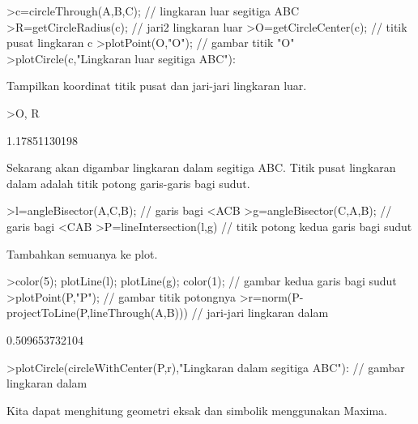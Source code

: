 \documentclass[a4paper,10pt]{article}
\begin{document}
\begin{eulernotebook}
\begin{eulercomment}
\begin{eulercomment}
\begin{eulercomment}
\begin{eulercomment}
\begin{eulercomment}
\begin{eulercomment}
\begin{eulercomment}
\begin{eulercomment}
\begin{eulerprompt}
>c=circleThrough(A,B,C); // lingkaran luar segitiga ABC
>R=getCircleRadius(c); // jari2 lingkaran luar 
>O=getCircleCenter(c); // titik pusat lingkaran c 
>plotPoint(O,"O"); // gambar titik "O"
>plotCircle(c,"Lingkaran luar segitiga ABC"):
\end{eulerprompt}
\begin{eulercomment}
Tampilkan koordinat titik pusat dan jari-jari lingkaran luar.
\end{eulercomment}
\begin{eulerprompt}
>O, R
\end{eulerprompt}
\begin{euleroutput}
  [1.16667,  1.16667]
  1.17851130198
\end{euleroutput}
\begin{eulercomment}
Sekarang akan digambar lingkaran dalam segitiga ABC. Titik pusat lingkaran dalam adalah
titik potong garis-garis bagi sudut.
\end{eulercomment}
\begin{eulerprompt}
>l=angleBisector(A,C,B); // garis bagi <ACB
>g=angleBisector(C,A,B); // garis bagi <CAB
>P=lineIntersection(l,g) // titik potong kedua garis bagi sudut
\end{eulerprompt}
\begin{euleroutput}
  [0.86038,  0.86038]
\end{euleroutput}
\begin{eulercomment}
Tambahkan semuanya ke plot.
\end{eulercomment}
\begin{eulerprompt}
>color(5); plotLine(l); plotLine(g); color(1); // gambar kedua garis bagi sudut
>plotPoint(P,"P"); // gambar titik potongnya
>r=norm(P-projectToLine(P,lineThrough(A,B))) // jari-jari lingkaran dalam
\end{eulerprompt}
\begin{euleroutput}
  0.509653732104
\end{euleroutput}
\begin{eulerprompt}
>plotCircle(circleWithCenter(P,r),"Lingkaran dalam segitiga ABC"): // gambar lingkaran dalam
\end{eulerprompt}
\begin{eulercomment}
Kita dapat menghitung geometri eksak dan simbolik menggunakan Maxima.


\end{eulercomment}
\end{eulercomment}
\end{eulercomment}
\end{eulercomment}
\end{eulercomment}
\end{eulercomment}
\end{eulercomment}
\end{eulercomment}
\end{eulercomment}
\end{eulernotebook}
\end{document}
